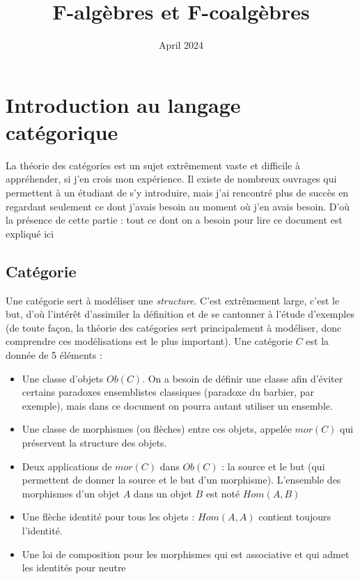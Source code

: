 \documentclass{article}
\title{F-algèbres et F-coalgèbres}
\date{April 2024}
\begin{document}
\maketitle
\tableofcontents
\newpage

\section{Introduction au langage catégorique}

La théorie des catégories est un sujet extrêmement vaste et difficile à appréhender, si j'en crois mon expérience. Il existe de nombreux ouvrages qui permettent à un étudiant de s'y introduire, mais j'ai rencontré plus de succès en regardant seulement ce dont j'avais besoin au moment où j'en avais besoin. D'où la présence de cette partie : tout ce dont on a besoin pour lire ce document est expliqué ici

\subsection{Catégorie}

Une catégorie sert à modéliser une \textit{structure}. C'est extrêmement large, c'est le but, d'où l'intérêt d'assimiler la définition et de se cantonner à l'étude d'exemples (de toute façon, la théorie des catégories sert principalement à modéliser, donc comprendre ces modélisations est le plus important). Une catégorie $C$ est la donnée de 5 éléments : 
\begin{itemize}
    \item Une classe d'objets $Ob(C)$. On a besoin de définir une classe afin d'éviter certains paradoxes ensemblistes classiques (paradoxe du barbier, par exemple), mais dans ce document on pourra autant utiliser un ensemble.
    \item Une classe de morphismes (ou flèches) entre ces objets, appelée $mor(C)$ qui préservent la structure des objets.
    \item Deux applications de $mor(C)$ dans $Ob(C)$ : la source et le but (qui permettent de donner la source et le but d'un morphisme). L'ensemble des morphismes d'un objet $A$ dans un objet $B$ est noté $Hom(A,B)$ 
    \item Une flèche identité pour tous les objets : $Hom(A,A)$ contient toujours l'identité.
    \item Une loi de composition pour les morphismes qui est associative et qui admet les identités pour neutre
\end{itemize}
\end{document}
